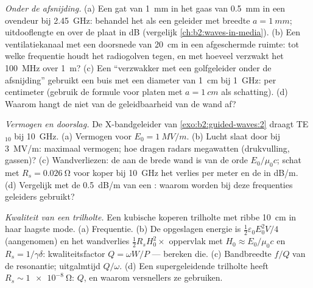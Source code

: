 \begin{exercise}[$\star\star$]\label{exo:b2:guided-waves:6}
\emph{Onder de afsnijding.} (a) Een gat van \qty{1}{mm} in het gaas van
\qty{0.5}{mm} in een ovendeur bij \qty{2.45}{GHz}: behandel het als een
geleider met breedte $a = \qty{1}{mm}$; uitdooflengte en  over de
plaat in dB (vergelijk \cref{ch:b2:waves-in-media}). (b) Een
ventilatiekanaal met een doorsnede van \qty{20}{cm} in een afgeschermde
ruimte: tot welke frequentie houdt het radiogolven tegen, en met hoeveel
verzwakt het \qty{100}{MHz} over \qty{1}{m}? (c) Een ``verzwakker met een
golfgeleider onder de afsnijding'' gebruikt een buis met een diameter van
\qty{1}{cm} bij \qty{1}{GHz}:  per centimeter (gebruik de formule
voor platen met $a =
\qty{1}{cm}$ als schatting). (d) Waarom hangt de
 niet van de geleidbaarheid van de wand af?
\end{exercise}

\begin{exercise}[$\star\star$]\label{exo:b2:guided-waves:7}
\emph{Vermogen en doorslag.} De X-bandgeleider van
\cref{exo:b2:guided-waves:2} draagt TE$_{10}$ bij \qty{10}{GHz}. (a)
Vermogen voor $E_0 = \qty{1}{MV/m}$. (b) Lucht slaat door bij \qty{3}{MV/m}:
maximaal vermogen; hoe dragen radars megawatten (drukvulling, gassen)? (c)
Wandverliezen: de  aan de brede wand is van de orde
$E_0/\mu_0c$; schat met $R_s = \qty{0.026}{\ohm}$ voor koper bij
\qty{10}{GHz} het verlies per meter en de  in dB/m. (d) Vergelijk
met de \qty{0.5}{dB/m} van een : waarom worden bij deze frequenties
geleiders gebruikt?
\end{exercise}

\begin{exercise}[$\star\star$]\label{exo:b2:guided-waves:8}
\emph{Kwaliteit van een trilholte.} Een kubische koperen trilholte met ribbe
\qty{10}{cm} in haar laagste mode. (a) Frequentie. (b) De opgeslagen energie
is $\tfrac12\varepsilon_0E_0^2V/4$ (aangenomen) en het wandverlies
$\tfrac12R_sH_0^2\times$ oppervlak met $H_0 \approx E_0/
\mu_0c$ en
$R_s = 1/\gamma\delta$: kwaliteitsfactor $Q = \omega W/P$ --- bereken die.
(c) Bandbreedte $f/Q$ van de resonantie; uitgalmtijd $Q/\omega$. (d) Een
supergeleidende trilholte heeft $R_s \sim \qty{1e-8}{\ohm}$: $Q$, en waarom
versnellers ze gebruiken.
\end{exercise}

